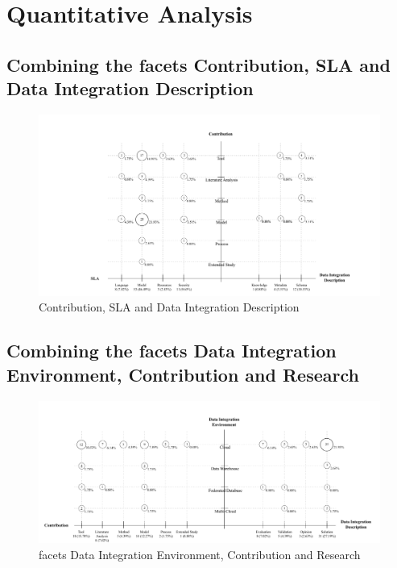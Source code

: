 \section{Quantitative Analysis}

\subsection{Combining the facets Contribution, SLA and Data Integration Description}

\begin{figure}[h!]
\centering
\includegraphics[scale=0.5]{figs/bubble-charts/Contribution-SLA-DIdescription.pdf} 
\caption{Contribution, SLA and Data Integration Description}\label{fig:facet1}
\end{figure}

\subsection{Combining the facets Data Integration Environment, Contribution and Research}

\begin{figure}[h!]
\centering
\includegraphics[scale=0.5]{figs/bubble-charts/DI-Environment-Contribution-Research.pdf}
\caption{facets Data Integration Environment, Contribution and Research}\label{fig:facet2}
\end{figure}


